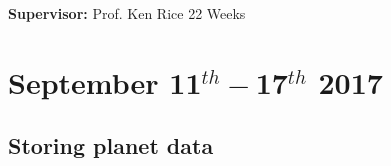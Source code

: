 \documentclass[11pt, oneside]{article}   	%
\begin{document}
\vspace*{0.35cm}

\vspace*{1cm}
{\bf Supervisor:} Prof. Ken Rice           %
\hfill
22 Weeks                                         %

\thispagestyle{empty}
\newpage
{}
\pagestyle{plain}
\tableofcontents
\newpage
{}
\pagestyle{fancy}

\section{September 11$^{th}-$17$^{th}$ 2017}

\subsection{Storing planet data}
\label{Planet}
\end{document}

